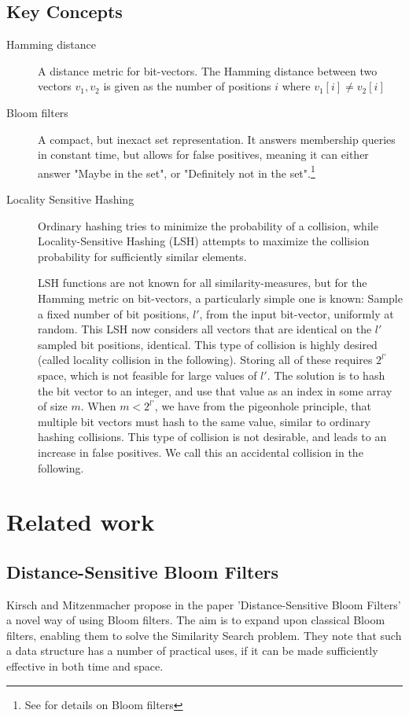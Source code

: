 \documentclass[a4paper,11pt]{article}
\begin{document}
\subsection{Key Concepts}
\label{sec:lsh}
\begin{description}
\item[Hamming distance]

A distance metric for bit-vectors. The Hamming distance between two vectors $v_1, v_2$ is given as the number of positions $i$ where $v_1[i] \neq v_2[i]$

\item[Bloom filters]
A compact, but inexact set representation. It answers membership queries in constant time, but allows for false positives, meaning it can either answer "Maybe in the set", or "Definitely not in the set".\footnote{See \cite{paper:bloom} for details on Bloom filters}

\item[Locality Sensitive Hashing]
Ordinary hashing tries to minimize the probability of a collision, while Locality-Sensitive Hashing (LSH) attempts to maximize the collision probability for sufficiently similar elements.

LSH functions are not known for all similarity-measures, but for the Hamming metric on bit-vectors, a particularly simple one is known: Sample a fixed number of bit positions, $l'$, from the input bit-vector, uniformly at random.
This LSH now considers all vectors that are identical on the $l'$ sampled bit positions, identical. This type of collision is highly desired (called locality collision in the following). Storing all of these requires $2^{l'}$ space, which is not feasible for large values of $l'$. The solution is to hash the bit vector to an integer, and use that value as an index in some array of size $m$. When $m < 2^{l'}$, we have from the pigeonhole principle, that multiple bit vectors must hash to the same value, similar to ordinary hashing collisions. This type of collision is not desirable, and leads to an increase in false positives. We call this an accidental collision in the following.
\end{description}

\section{Related work}

\subsection{Distance-Sensitive Bloom Filters}
Kirsch and Mitzenmacher propose in the paper 'Distance-Sensitive Bloom Filters'\cite{paper:harvard} a novel way of using Bloom filters. The aim is to expand upon classical Bloom filters, enabling them to solve the Similarity Search problem. They note that such a data structure has a number of practical uses, if it can be made sufficiently effective in both time and space.
\end{document}
